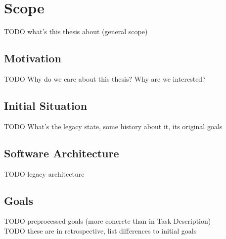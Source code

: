 \chapter{Scope}
TODO what's this thesis about (general scope)

\section{Motivation}
TODO Why do we care about this thesis? Why are we interested?\\

\section{Initial Situation}
TODO What's the legacy state, some history about it, its original goals

\section{Software Architecture}
TODO legacy architecture\\


\section{Goals}
TODO preprocessed goals (more concrete than in Task Description)\\
TODO these are in retrospective, list differences to initial goals\\
